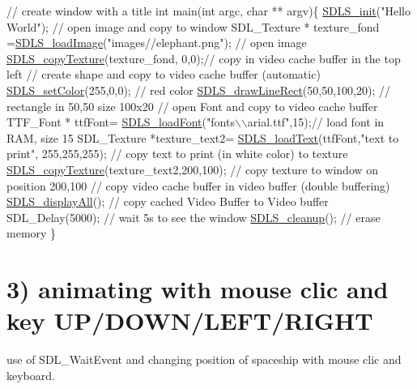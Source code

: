 \begin{DoxyCode}
\textcolor{comment}{// create window with a title}
 \textcolor{keywordtype}{int} main(\textcolor{keywordtype}{int} argc, \textcolor{keywordtype}{char} ** argv)\{
  \hyperlink{_s_d_l_s_8c_a75205531dbfd4d3a3166e245227b9c12}{SDLS\_init}(\textcolor{stringliteral}{"Hello World"});
 \textcolor{comment}{// open image and copy to window}
  SDL\_Texture * texture\_fond =\hyperlink{_s_d_l_s_8c_ad6c27fd6e5502847ca73fb30f990cf0a}{SDLS\_loadImage}(\textcolor{stringliteral}{"images//elephant.png"}); \textcolor{comment}{// open image}
  \hyperlink{_s_d_l_s_8c_a8a47ba62fed8a205c80cc93f521cb2e2}{SDLS\_copyTexture}(texture\_fond, 0,0);\textcolor{comment}{// copy in video cache buffer in the top left}
 \textcolor{comment}{// create shape and copy to video cache buffer (automatic)}
  \hyperlink{_s_d_l_s_8c_a9ca4cfe7300c96dc8e368c40eee123cd}{SDLS\_setColor}(255,0,0); \textcolor{comment}{//  red color}
  \hyperlink{_s_d_l_s_8c_aa33fb0d50840e9163294cc07409f7f83}{SDLS\_drawLineRect}(50,50,100,20); \textcolor{comment}{// rectangle in 50,50 size 100x20}
 \textcolor{comment}{// open Font and copy to video cache buffer}
  TTF\_Font * ttfFont= \hyperlink{_s_d_l_s_8c_a726e1ef2a32862e250398da12718e007}{SDLS\_loadFont}(\textcolor{stringliteral}{"fonts\(\backslash\)\(\backslash\)arial.ttf"},15);\textcolor{comment}{// load font in RAM, size 15}
  SDL\_Texture *texture\_text2= \hyperlink{_s_d_l_s_8c_ad8193a9d3dd61d9811b17cee936f7507}{SDLS\_loadText}(ttfFont,\textcolor{stringliteral}{"text to print"}, 255,255,255); \textcolor{comment}{// copy
       text to print (in white color) to texture}
  \hyperlink{_s_d_l_s_8c_a8a47ba62fed8a205c80cc93f521cb2e2}{SDLS\_copyTexture}(texture\_text2,200,100); \textcolor{comment}{// copy texture to window on position 200,100}
 \textcolor{comment}{// copy  video cache buffer in video buffer (double buffering)}
  \hyperlink{_s_d_l_s_8c_a139692381ca40eb058ee477b4f561189}{SDLS\_displayAll}(); \textcolor{comment}{// copy cached Video Buffer to Video buffer}
  SDL\_Delay(5000); \textcolor{comment}{// wait 5s to see the window}
  \hyperlink{_s_d_l_s_8c_aacc824d008ac615b82cc715c567ff91a}{SDLS\_cleanup}();  \textcolor{comment}{// erase memory}
 \}
\end{DoxyCode}
\hypertarget{index_second}{}\section{3) animating with mouse clic and key U\+P/\+D\+O\+W\+N/\+L\+E\+F\+T/\+R\+I\+G\+HT}\label{index_second}
use of S\+D\+L\+\_\+\+Wait\+Event and changing position of spaceship with mouse clic and keyboard. 
